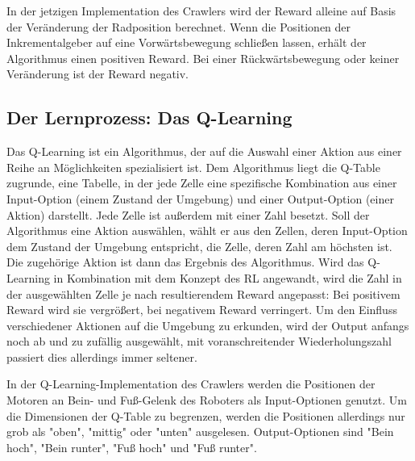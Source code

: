 In der jetzigen Implementation des Crawlers wird der Reward alleine auf Basis der Veränderung der Radposition berechnet. Wenn die Positionen der Inkrementalgeber auf eine Vorwärtsbewegung schließen lassen, erhält der Algorithmus einen positiven Reward. Bei einer Rückwärtsbewegung oder keiner Veränderung ist der Reward negativ.

\subsection{Der Lernprozess: Das Q-Learning}

Das Q-Learning ist ein Algorithmus, der auf die Auswahl einer Aktion aus einer Reihe an Möglichkeiten spezialisiert ist. Dem Algorithmus liegt die Q-Table zugrunde, eine Tabelle, in der jede Zelle eine spezifische Kombination aus einer Input-Option (einem Zustand der Umgebung) und einer Output-Option (einer Aktion) darstellt. Jede Zelle ist außerdem mit einer Zahl besetzt. Soll der Algorithmus eine Aktion auswählen, wählt er aus den Zellen, deren Input-Option dem Zustand der Umgebung entspricht, die Zelle, deren Zahl am höchsten ist. Die zugehörige Aktion ist dann das Ergebnis des Algorithmus. Wird das Q-Learning in Kombination mit dem Konzept des RL angewandt, wird die Zahl in der ausgewählten Zelle je nach resultierendem Reward angepasst: Bei positivem Reward wird sie vergrößert, bei negativem Reward verringert. Um den Einfluss verschiedener Aktionen auf die Umgebung zu erkunden, wird der Output anfangs noch ab und zu zufällig ausgewählt, mit voranschreitender Wiederholungszahl passiert dies allerdings immer seltener.

In der Q-Learning-Implementation des Crawlers werden die Positionen der Motoren an Bein- und Fuß-Gelenk des Roboters als Input-Optionen genutzt. Um die Dimensionen der Q-Table zu begrenzen, werden die Positionen allerdings nur grob als "oben", "mittig" oder "unten" ausgelesen. Output-Optionen sind "Bein hoch", "Bein runter", "Fuß hoch" und "Fuß runter".


